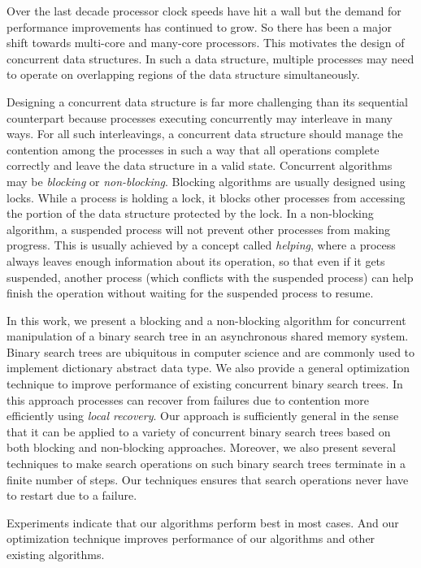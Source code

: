 Over the last decade processor clock speeds have hit a wall but the demand for performance improvements has continued to grow. So there has been a major shift towards multi-core and many-core processors. This motivates the design of concurrent data structures. In such a data structure, multiple processes may need to operate on overlapping regions of the data structure simultaneously.

Designing a concurrent data structure is far more challenging than its sequential counterpart because processes executing concurrently may interleave in many ways. For all such interleavings, a concurrent data structure should manage the contention among the processes in such a way that all operations complete correctly and leave the data structure in a valid state. Concurrent algorithms may be \emph{blocking} or \emph{non-blocking}. Blocking algorithms are usually designed using locks. While a process is holding a lock, it blocks other processes from accessing the portion of the data structure protected by the lock. In a non-blocking algorithm, a suspended process will not prevent other processes from making progress. This is usually achieved by a concept called \emph{helping}, where a process always leaves enough information about its operation, so that even if it gets suspended, another process (which conflicts with the suspended process) can help finish the operation without waiting for the suspended process to resume.

In this work, we present a blocking and a non-blocking algorithm for concurrent manipulation of a binary search tree in an asynchronous shared memory system. Binary search trees are ubiquitous in computer science and are commonly used to implement dictionary abstract data type. We also provide a general optimization technique to improve performance of existing concurrent binary search trees. In this approach processes can recover from failures due to contention more efficiently using \emph{local recovery}. Our approach is sufficiently general in the sense that it can be applied to a variety of concurrent binary search trees based on both blocking and non-blocking approaches. Moreover, we also present several techniques to make search operations on such binary search trees terminate in a finite number of steps. Our techniques ensures that search operations never have to restart due to a failure.

Experiments indicate that our algorithms perform best in most cases. And our optimization technique improves performance of our algorithms and other existing algorithms. 